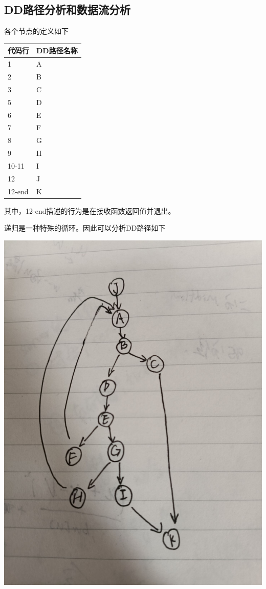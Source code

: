 \documentclass[12pt, a4paper, oneside]{ctexart}
\begin{document}
\subsection{DD路径分析和数据流分析}

各个节点的定义如下

\newpage
\begin{table}[!h]
    \begin{tabular}{|l|l|}
    \hline
    代码行 & DD路径名称\\ \hline
    1 & A\\ \hline
    2 & B\\ \hline
    3 & C \\ \hline
    5 & D \\ \hline
    6 & E \\ \hline
    7 & F \\ \hline
    8 & G \\ \hline
    9 & H \\ \hline
    10-11 & I \\ \hline
    12 & J \\ \hline
    12-end & K \\ \hline
    \end{tabular}
\end{table}

其中，12-end描述的行为是在接收函数返回值并退出。


递归是一种特殊的循环。因此可以分析DD路径如下

\includegraphics[scale=0.2]{screenshots/DD-search.jpg}
\end{document}
